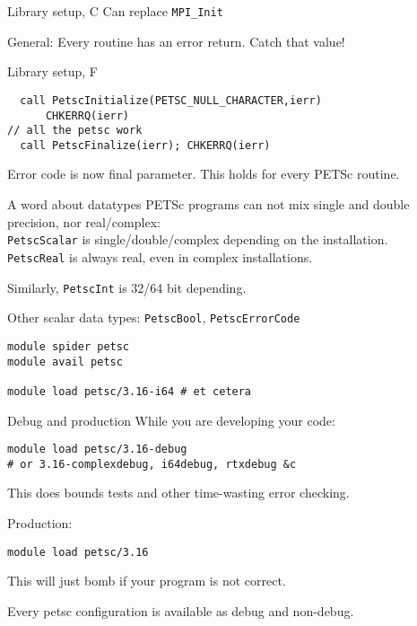 \lstset{language=C}

\begin{c}
\begin{numberedframe}{Library setup, C}
Can replace \lstinline{MPI_Init}

General: Every routine has an error return. Catch that value!
\end{numberedframe}
\end{c}

\lstset{language=Fortran}
\begin{fortran}
\begin{numberedframe}{Library setup, F}
\begin{lstlisting}
  call PetscInitialize(PETSC_NULL_CHARACTER,ierr)
      CHKERRQ(ierr)
// all the petsc work
  call PetscFinalize(ierr); CHKERRQ(ierr)
\end{lstlisting}
Error code is now final parameter. This holds for every PETSc routine.
\end{numberedframe}
\end{fortran}

\lstset{language=C}

\begin{numberedframe}{A word about datatypes}
PETSc programs can not mix single and double precision, nor real/complex:\\
\lstinline{PetscScalar} is single/double/complex depending on the installation.\\
\lstinline{PetscReal} is always real, even in complex installations.

Similarly, \lstinline{PetscInt} is 32/64 bit depending.

Other scalar data types: \lstinline{PetscBool}, \lstinline{PetscErrorCode}

\begin{taccnote}
\begin{verbatim}
module spider petsc
module avail petsc

module load petsc/3.16-i64 # et cetera
\end{verbatim}
\end{taccnote}

\end{numberedframe}

\begin{numberedframe}{Debug and production}
While you are developing your code:
\begin{verbatim}
module load petsc/3.16-debug
# or 3.16-complexdebug, i64debug, rtxdebug &c
\end{verbatim}
This does bounds tests and other time-wasting error checking.

Production:
\begin{verbatim}
module load petsc/3.16
\end{verbatim}
This will just bomb if your program is not correct.

Every petsc configuration is available as debug and non-debug.
\end{numberedframe}

